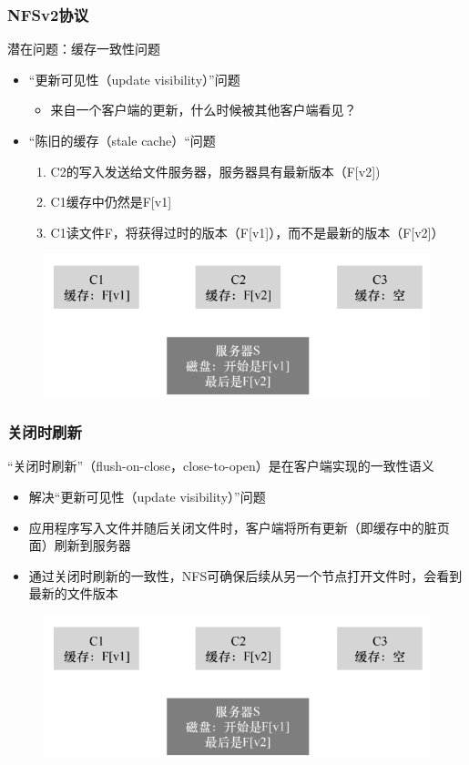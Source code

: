 \begin{frame}[fragile]
    \frametitle{NFSv2协议}
    潜在问题：缓存一致性问题
    
    \begin{itemize}
        \item “更新可见性（update visibility）”问题
        \begin{itemize}
            \item  来自一个客户端的更新，什么时候被其他客户端看见？\pause
        \end{itemize}
        \item “陈旧的缓存（stale cache）“问题
        \begin{enumerate}
            \item  C2的写入发送给文件服务器，服务器具有最新版本（F[v2])
            \item  C1缓存中仍然是F[v1]
            \item  C1读文件F，将获得过时的版本（F[v1]），而不是最新的版本（F[v2]）
        \end{enumerate}
    \end{itemize}
    
    \begin{figure}
        \includegraphics[width=0.5\linewidth]{figs/nfsv2-cache.png}
    \end{figure}
    
\end{frame}


\begin{frame}[fragile]
    \frametitle{关闭时刷新}
“关闭时刷新”（flush-on-close，close-to-open）是在客户端实现的一致性语义
    \begin{itemize}
        \item 解决“更新可见性（update visibility）”问题 \pause
        \item 应用程序写入文件并随后关闭文件时，客户端将所有更新（即缓存中的脏页面）刷新到服务器
        \item 通过关闭时刷新的一致性，NFS可确保后续从另一个节点打开文件时，会看到最新的文件版本
    \end{itemize}
    
    \begin{figure}
        \includegraphics[width=0.5\linewidth]{figs/nfsv2-cache.png}
    \end{figure}
    
\end{frame}

